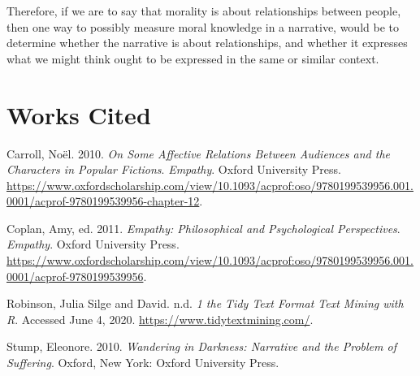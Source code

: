 \documentclass[]{article}
\begin{document}
Therefore, if we are to say that morality is about relationships between
people, then one way to possibly measure moral knowledge in a narrative,
would be to determine whether the narrative is about relationships, and
whether it expresses what we might think ought to be expressed in the
same or similar context.

\hypertarget{works-cited}{%
\section*{Works Cited}\label{works-cited}}

\hypertarget{refs}{}
\leavevmode\hypertarget{ref-carr10}{}%
Carroll, Noël. 2010. \emph{On Some Affective Relations Between Audiences
and the Characters in Popular Fictions}. \emph{Empathy}. Oxford
University Press.
\url{https://www.oxfordscholarship.com/view/10.1093/acprof:oso/9780199539956.001.0001/acprof-9780199539956-chapter-12}.

\leavevmode\hypertarget{ref-copl11b}{}%
Coplan, Amy, ed. 2011. \emph{Empathy: Philosophical and Psychological
Perspectives}. \emph{Empathy}. Oxford University Press.
\url{https://www.oxfordscholarship.com/view/10.1093/acprof:oso/9780199539956.001.0001/acprof-9780199539956}.

\leavevmode\hypertarget{ref-robi00}{}%
Robinson, Julia Silge and David. n.d. \emph{1 the Tidy Text Format
\textbar{} Text Mining with R}. Accessed June 4, 2020.
\url{https://www.tidytextmining.com/}.

\leavevmode\hypertarget{ref-stum10}{}%
Stump, Eleonore. 2010. \emph{Wandering in Darkness: Narrative and the
Problem of Suffering}. Oxford, New York: Oxford University Press.
\end{document}
